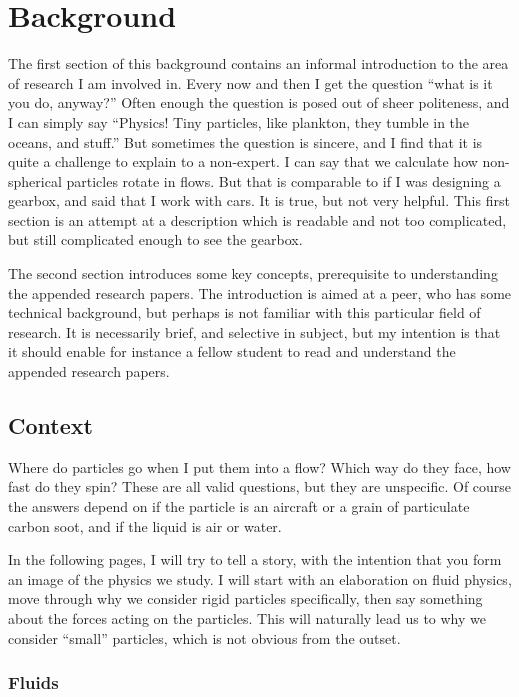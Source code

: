 \documentclass[thesis.tex]{subfiles}
\begin{document}
\chapter{Background}

The first section of this background contains an informal introduction to the area of research I am involved in. Every now and then I get the question ``what is it you do, anyway?'' Often enough the question is posed out of sheer politeness, and I can simply say ``Physics! Tiny particles, like plankton, they tumble in the oceans, and stuff.'' But sometimes the question is sincere, and I find that it is quite a challenge to explain to a non-expert. I can say that we calculate how non-spherical particles rotate in flows. But that is comparable to if I was designing a gearbox, and said that I work with cars. It is true, but not very helpful. This first section is an attempt at a description which is readable and not too complicated, but still complicated enough to see the gearbox.

The second section introduces some key concepts, prerequisite to understanding the appended research papers. The introduction is aimed at a peer, who has some technical background, but perhaps is not familiar with this particular field of research. It is necessarily brief, and selective in subject, but my intention is that it should enable for instance a fellow student to read and understand the appended research papers.

\section{Context}\label{sec:context}

Where do particles go when I put them into a flow? Which way do they face, how fast do they spin? These are all valid questions, but they are unspecific. Of course the answers depend on if the particle is an aircraft or a grain of particulate carbon soot, and if the liquid is air or water. 

In the following pages, I will try to tell a story, with the intention that you form an image of the physics we study. I will start with an elaboration on fluid physics, move through why we consider rigid particles specifically, then say something about the forces acting on the particles. This will naturally lead us to why we consider ``small'' particles, which is not obvious from the outset.

\subsection*{Fluids}
\end{document}
